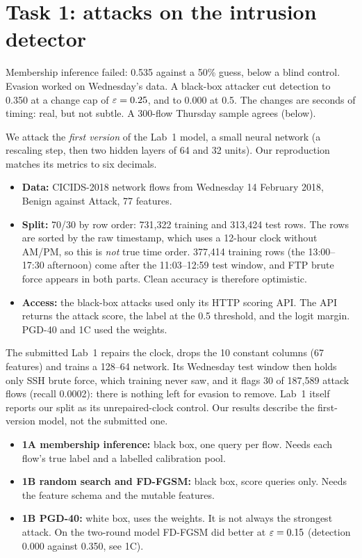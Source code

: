 \section{Task 1: attacks on the intrusion detector}

 Membership inference failed: 0.535 against a 50\% guess, below a blind control. Evasion worked on Wednesday's data. A black-box attacker cut detection to 0.350 at a change cap of $\varepsilon=0.25$, and to 0.000 at 0.5. The changes are seconds of timing: real, but not subtle. A 300-flow Thursday sample agrees (below).

 We attack the \emph{first version} of the Lab~1 model, a small neural network (a rescaling step, then two hidden layers of 64 and 32 units). Our reproduction matches its metrics to six decimals.
\begin{itemize}
\item \textbf{Data:} CICIDS-2018 network flows from Wednesday 14 February 2018, Benign against Attack, 77 features.
\item \textbf{Split:} 70/30 by row order: 731{,}322 training and 313{,}424 test rows. The rows are sorted by the raw timestamp, which uses a 12-hour clock without AM/PM, so this is \emph{not} true time order. 377{,}414 training rows (the 13:00--17:30 afternoon) come after the 11:03--12:59 test window, and FTP brute force appears in both parts. Clean accuracy is therefore optimistic.
\item \textbf{Access:} the black-box attacks used only its HTTP scoring API. The API returns the attack score, the label at the 0.5 threshold, and the logit margin. PGD-40 and 1C used the weights.
\end{itemize}

 The submitted Lab~1 repairs the clock, drops the 10 constant columns (67 features) and trains a 128--64 network. Its Wednesday test window then holds only SSH brute force, which training never saw, and it flags 30 of 187{,}589 attack flows (recall 0.0002): there is nothing left for evasion to remove. Lab~1 itself reports our split as its unrepaired-clock control. Our results describe the first-version model, not the submitted one.

\begin{itemize}
\item \textbf{1A membership inference:} black box, one query per flow. Needs each flow's true label and a labelled calibration pool.
\item \textbf{1B random search and FD-FGSM:} black box, score queries only. Needs the feature schema and the mutable features.
\item \textbf{1B PGD-40:} white box, uses the weights. It is not always the strongest attack. On the two-round model FD-FGSM did better at $\varepsilon=0.15$ (detection 0.000 against 0.350, see 1C).
\end{itemize}

